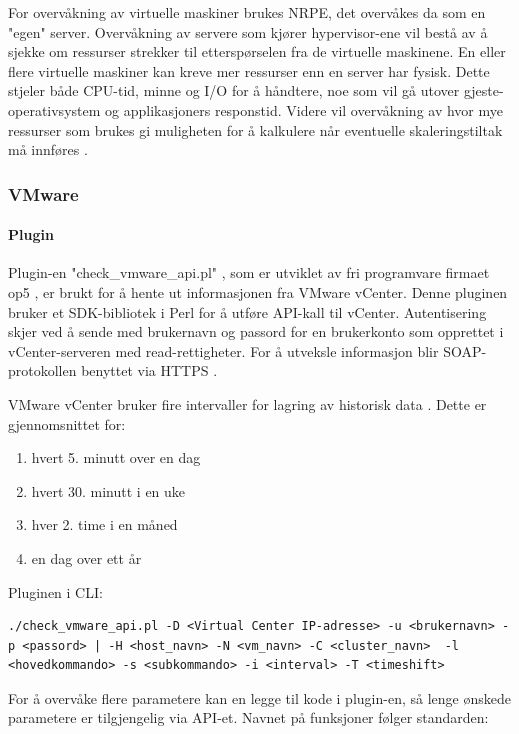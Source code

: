 For overvåkning av virtuelle maskiner brukes NRPE, det overvåkes da som en "egen" server. Overvåkning av servere som kjører hypervisor-ene vil bestå av å sjekke om ressurser strekker til etterspørselen fra de virtuelle maskinene. En eller flere virtuelle maskiner kan kreve mer ressurser enn en server har fysisk. Dette stjeler både CPU-tid, minne og I/O for å håndtere, noe som vil gå utover gjeste-operativsystem og applikasjoners responstid. Videre vil overvåkning av hvor mye ressurser som brukes gi muligheten for å kalkulere når eventuelle skaleringstiltak må innføres \cite{vmwaremonitoring}. 

\subsubsection{VMware}
\paragraph{Plugin}
Plugin-en "check\_vmware\_api.pl" , som er utviklet av fri programvare firmaet op5 \cite{op5}, er brukt for å hente ut informasjonen fra VMware vCenter. Denne pluginen bruker et SDK-bibliotek i Perl \cite{vmwareperl} for å utføre API-kall til vCenter. Autentisering skjer ved å sende med brukernavn og passord for en brukerkonto som opprettet i vCenter-serveren med read-rettigheter. For å utveksle informasjon blir SOAP-protokollen benyttet \cite{wiki:soap} via HTTPS \cite{ciscovirtual}.

VMware vCenter bruker fire intervaller for lagring av historisk data \cite{vmwareperfintervals}. Dette er gjennomsnittet for:
\begin{enumerate}
        \item hvert 5. minutt over en dag
        \item hvert 30. minutt i en uke
        \item hver 2. time i en måned
        \item en dag over ett år
\end{enumerate}

Pluginen i CLI:

\begin{lstlisting}[style=example]
./check_vmware_api.pl -D <Virtual Center IP-adresse> -u <brukernavn> -p <passord> | -H <host_navn> -N <vm_navn> -C <cluster_navn>  -l <hovedkommando> -s <subkommando> -i <interval> -T <timeshift>
\end{lstlisting}

For å overvåke flere parametere kan en legge til kode i plugin-en, så lenge ønskede parametere er tilgjengelig via API-et. Navnet på funksjoner følger standarden:

